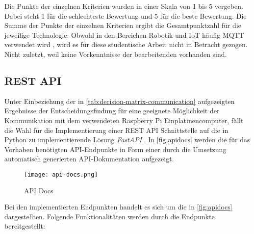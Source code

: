 Die Punkte der einzelnen Kriterien wurden in einer Skala von 1 bis 5
vergeben. Dabei steht 1 für die schlechteste Bewertung und 5 für die beste Bewertung. Die Summe der Punkte der einzelnen Kriterien ergibt die Gesamtpunktzahl für die jeweilige Technologie.
Obwohl in den Bereichen Robotik und IoT häufig MQTT verwendet wird \cite{AMARAN2015400}, wird es für diese studentische Arbeit nicht in Betracht gezogen. Nicht zuletzt, weil keine Vorkenntnisse der bearbeitenden vorhanden sind.

\subsection{REST API}
Unter Einbeziehung der in \autoref{tab:decision-matrix-communication} aufgezeigten Ergebnisse der Entscheidungsfindung für eine geeignete Möglichkeit der Kommunikation mit dem verwendeten Raspberry Pi Einplatinencomputer, fällt die Wahl für die Implementierung einer REST API Schnittstelle auf die in Python zu implementierende Lösung \textit{FastAPI} \cite{tiangolo_fastapi_features}. In \autoref{fig:apidocs} werden die für das Vorhaben benötigten API-Endpunkte in Form einer durch die Umsetzung automatisch generierten API-Dokumentation aufgezeigt.
\begin{figure}[H]
  \centering
  \texttt{[image: api-docs.png]}
  \caption{API Docs}
  \label{fig:apidocs}
\end{figure}

Bei den implementierten Endpunkten handelt es sich um die in \autoref{fig:apidocs} dargestellten. Folgende Funktionalitäten werden durch die Endpunkte bereitgestellt:

